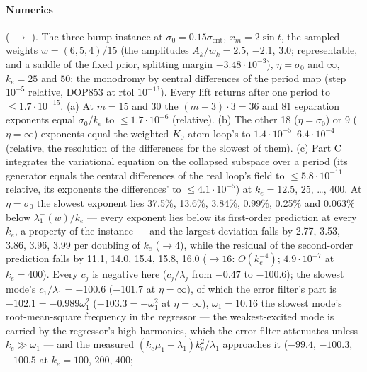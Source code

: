 \begin{sloppypar}
\paragraph{Numerics} ( $\to$ ). The three-bump
instance at $\sigma_0 = 0.15\sigma_{\mathrm{crit}}$, $x_m = 2\sin t$, the sampled weights $w = (6,5,4)/15$ (the
amplitudes $A_k/w_k = 2.5$, $-2.1$, $3.0$; representable, and a saddle of the fixed prior, splitting margin
$-3.48\cdot10^{-3}$), $\eta = \sigma_0$ and $\infty$, $k_e = 25$ and $50$; the monodromy by central differences of the
period map (step $10^{-5}$ relative, DOP853 at rtol $10^{-13}$). Every lift returns after one period to
$\le1.7\cdot10^{-15}$. (a) At $m = 15$ and $30$ the $(m - 3)\cdot3 = 36$ and $81$ separation exponents equal
$\sigma_0/k_e$ to $\le1.7\cdot10^{-6}$ (relative). (b) The other 18 ($\eta = \sigma_0$) or 9 ($\eta = \infty$)
exponents equal the weighted $K_0$-atom loop's to $1.4\cdot10^{-5}$--$6.4\cdot10^{-4}$ (relative, the resolution of
the differences for the slowest of them). (c) Part C integrates the variational equation on the collapsed subspace
over a period (its generator equals the central differences of the real loop's field to $\le5.8\cdot10^{-11}$
relative, its exponents the differences' to $\le4.1\cdot10^{-5}$) at $k_e = 12.5$, $25$, \dots, $400$. At
$\eta = \sigma_0$ the slowest exponent lies 37.5\%, 13.6\%, 3.84\%, 0.99\%, 0.25\% and 0.063\% below
$\lambda_1^-(w)/k_e$ --- every exponent lies below its first-order prediction at every $k_e$, a property of the
instance --- and the largest deviation falls by 2.77, 3.53, 3.86, 3.96, 3.99 per doubling of $k_e$ ($\to4$), while
the residual of the second-order prediction falls by 11.1, 14.0, 15.4, 15.8, 16.0 ($\to16$: $O(k_e^{-4})$;
$4.9\cdot10^{-7}$ at $k_e = 400$). Every $c_j$ is negative here ($c_j/\lambda_j$ from $-0.47$ to $-100.6$); the
slowest mode's $c_1/\lambda_1 = -100.6$ ($-101.7$ at $\eta = \infty$), of which the error filter's part is
$-102.1 = -0.989\omega_1^2$ ($-103.3 = -\omega_1^2$ at $\eta = \infty$), $\omega_1 = 10.16$ the slowest mode's
root-mean-square frequency in the regressor --- the weakest-excited mode is carried by the regressor's high harmonics,
which the error filter attenuates unless $k_e\gg\omega_1$ --- and the measured
$(k_e\mu_1 - \lambda_1)k_e^2/\lambda_1$ approaches it ($-99.4$, $-100.3$, $-100.5$ at $k_e = 100$, $200$, $400$;

\end{sloppypar}
